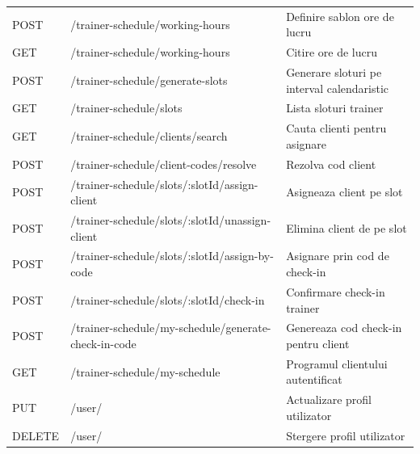 \begin{longtable}{p{} p{} p{}}
POST & /trainer-schedule/working-hours & Definire sablon ore de lucru \\
GET & /trainer-schedule/working-hours & Citire ore de lucru \\
POST & /trainer-schedule/generate-slots & Generare sloturi pe interval calendaristic \\
GET & /trainer-schedule/slots & Lista sloturi trainer \\
GET & /trainer-schedule/clients/search & Cauta clienti pentru asignare \\
POST & /trainer-schedule/client-codes/resolve & Rezolva cod client \\
POST & /trainer-schedule/slots/:slotId/assign-client & Asigneaza client pe slot \\
POST & /trainer-schedule/slots/:slotId/unassign-client & Elimina client de pe slot \\
POST & /trainer-schedule/slots/:slotId/assign-by-code & Asignare prin cod de check-in \\
POST & /trainer-schedule/slots/:slotId/check-in & Confirmare check-in trainer \\
POST & /trainer-schedule/my-schedule/generate-check-in-code & Genereaza cod check-in pentru client \\
GET & /trainer-schedule/my-schedule & Programul clientului autentificat \\

PUT & /user/ & Actualizare profil utilizator \\
DELETE & /user/ & Stergere profil utilizator \\

\bottomrule
\end{longtable}
